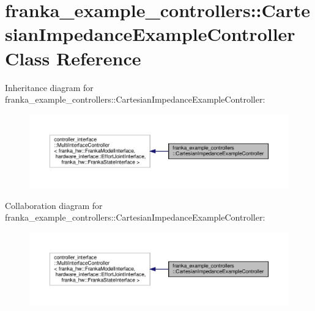 \hypertarget{classfranka__example__controllers_1_1_cartesian_impedance_example_controller}{}\section{franka\+\_\+example\+\_\+controllers\+:\+:Cartesian\+Impedance\+Example\+Controller Class Reference}
\label{classfranka__example__controllers_1_1_cartesian_impedance_example_controller}


Inheritance diagram for franka\+\_\+example\+\_\+controllers\+:\+:Cartesian\+Impedance\+Example\+Controller\+:
\nopagebreak
\begin{figure}[H]
\begin{center}
\leavevmode
\includegraphics[width=350pt]{classfranka__example__controllers_1_1_cartesian_impedance_example_controller__inherit__graph}
\end{center}
\end{figure}


Collaboration diagram for franka\+\_\+example\+\_\+controllers\+:\+:Cartesian\+Impedance\+Example\+Controller\+:
\nopagebreak
\begin{figure}[H]
\begin{center}
\leavevmode
\includegraphics[width=350pt]{classfranka__example__controllers_1_1_cartesian_impedance_example_controller__coll__graph}
\end{center}
\end{figure}
